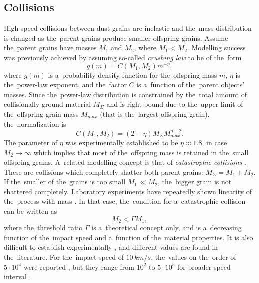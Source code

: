 \subsection{Collisions} \label{ch:collisions}

High-speed collisions between dust grains are inelastic and the~mass distribution is changed as the~parent grains produce smaller offspring grains. Assume the~parent grains have masses $M_1$ and $M_2$, where $M_1 < M_2$. Modelling success was previously achieved \citep{gault1963spray,dohnanyi1969collisional} by assuming so-called \textit{crushing law} to be of the~form
\begin{equation}
    g(m) = C(M_1,M_2)m^{-\eta},
    \label{eq:crushing_law}
\end{equation}
where $g(m)$ is a~probability density function for the~offspring mass $m$, $\eta$ is the~power-law exponent, and the~factor $C$ is a~function of the~parent objects' masses. Since the~power-law distribution is constrained by the~total amount of collisionally ground material $M_\Sigma$ and is right-bound due to the~upper limit of the~offspring grain mass $M_{max}$ (that is the~largest offspring grain), the~normalization is
\begin{equation}
    C(M_1,M_2) = (2-\eta) M_\Sigma M_{max}^{\eta -2}.
\end{equation}
The parameter of $\eta$ was experimentally established \citep{gault1963spray} to be $\eta \approx 1.8$, in case $M_2 \rightarrow \infty$ which implies that most of the~offspring mass is retained in the~small offspring grains. 
A~related modelling concept is that of \textit{catastrophic collisions} \citep{dohnanyi1969collisional,grun1985collisional}. These are collisions which completely shatter both parent grains: $M_\Sigma = M_1 + M_2$. If the~smaller of the~grains is too small $M_1 \ll M_2$, the~bigger grain is not shattered completely. Laboratory experiments have repeatedly shown linearity of the~process with mass \citep{gault1963spray,dietzel1973heos,grun1984impact,mcbride1999meteoroid,collette2014micrometeoroid,shen2021cosmic}. In that case, the~condition for a~catastrophic collision can be written as 
\begin{equation}
    M_2 < \Gamma M_1,
\end{equation}
where the~threshold ratio $\Gamma$ is a~theoretical concept only, and is a~decreasing function of the~impact speed and a~function of the~material properties. It is also difficult to establish experimentally \citep{grun1985collisional}, and different values are found in the~literature. For the~impact speed of $10 \, \si{km/s}$, the~values on the~order of $5 \cdot 10^{4}$ were reported \citep{gault1969destruction,fujiwara1977destruction}, but they range from $10^2$ to $5\cdot 10^5$ for broader speed interval \citep{whipple1967maintaining,zook1975source,dohnanyi1978particle}. 
